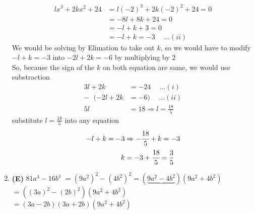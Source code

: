 \begin{multicols}{2}
\begin{enumerate}[label={\textbf{\arabic*.}}]
\begin{align*}
       lx^3 + 2kx^2 + 24 &= l(-2)^3 + 2k(-2)^2 + 24 = 0 \\
       & = -8l + 8k + 24 = 0 \\ 
       & = -l + k + 3 = 0  \\
       &= -l + k = -3 \hspace{15pt} ...(ii)
    \end{align*}
    We would be solving by Elimation to take out $k$, so we would 
    have to modify $-l + k = -3 $ into $-2l + 2k = -6$ by multiplying by $2$ \\
    So, because the sign of the $k$ on both equation are same, we would use substraction \vspace{-8pt}
    \begin{align*} 
         3l + 2k &= -24 \hspace{15pt}...(i) \\
        - \hspace{7pt} (-2l + 2k &= -6) \hspace{15pt} ...(ii) \\
        5l & = 18 \Rightarrow l = \frac{18}{5} 
    \end{align*} 
    substitute $l = \frac{18}{5}$ into any equation \vspace{-10pt}
    \begin{align*}
      -l + k = -3 &\Rightarrow -\cfrac{18}{5} + k = -3 \\
       k &= -3 + \cfrac{18}{5} =\frac{3}{5} \
    \end{align*}


    \item \textbf{(E)} $81a^4 - 16b^4$ 
    $= (9a^2)^2 - (4b^2)^2 = (\underbrace{9a^2 - 4b^2})(9a^2 + 4b^2)$ \\
    $= ((3a)^2 - (2b)^2)(9a^2 + 4b^2)$ \\
     $= (3a - 2b)(3a + 2b)(9a^2 + 4b^2)$
    

\end{enumerate}
\end{multicols}
